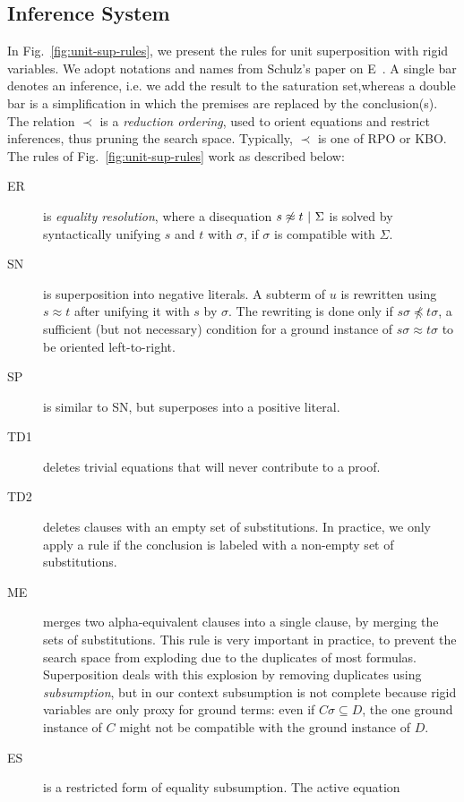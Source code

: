 \subsection{Inference System}

In Fig.~\ref{fig:unit-sup-rules}, we present the rules for unit superposition
with rigid variables. We adopt notations and names from Schulz's paper on
E~\cite{SS02}. A single bar denotes an inference, i.e. we add the result to the
saturation set,whereas a double bar is a simplification in which the premises
are replaced by the conclusion(s). The relation $\prec$ is a {\em reduction
ordering}, used to orient equations and restrict inferences, thus pruning the search space.
Typically,
$\prec$ is one of RPO or KBO. The rules of Fig.~\ref{fig:unit-sup-rules} work as
described below:

\begin{description}
\item[ER] is {\em equality resolution}, where a disequation
$s \not\approx t ~|~ \Sigma$ is solved by syntactically unifying
$s$ and $t$ with $\sigma$, if $\sigma$ is compatible with $\Sigma$.
\item[SN] is superposition into negative literals. A subterm of $u$ is rewritten
using $s \approx t$ after unifying it with $s$ by $\sigma$. The rewriting is
done only if $s\sigma \not\preceq t\sigma$, a sufficient (but not necessary)
condition for a ground instance of $s\sigma \approx t\sigma$ to be oriented
left-to-right.
\item[SP] is similar to SN, but superposes into a positive literal.
\item[TD1] deletes trivial equations that will never contribute to a proof.
\item[TD2] deletes clauses with an empty set of substitutions. In practice, we
only apply a rule if the conclusion is labeled with a non-empty set of
substitutions.
\item[ME] merges two alpha-equivalent clauses into a single clause, by merging
the sets of substitutions. This rule is very important in practice, to prevent
the search space from exploding due to the duplicates of most formulas.
Superposition deals with this explosion by removing duplicates using
{\em subsumption}, but in our context subsumption is not complete because rigid
variables are only proxy for ground terms: even if $C\sigma \subseteq D$, the
one ground instance of $C$ might not be compatible with the ground instance of
$D$.
\item[ES] is a restricted form of equality subsumption. The active equation

\end{description}
